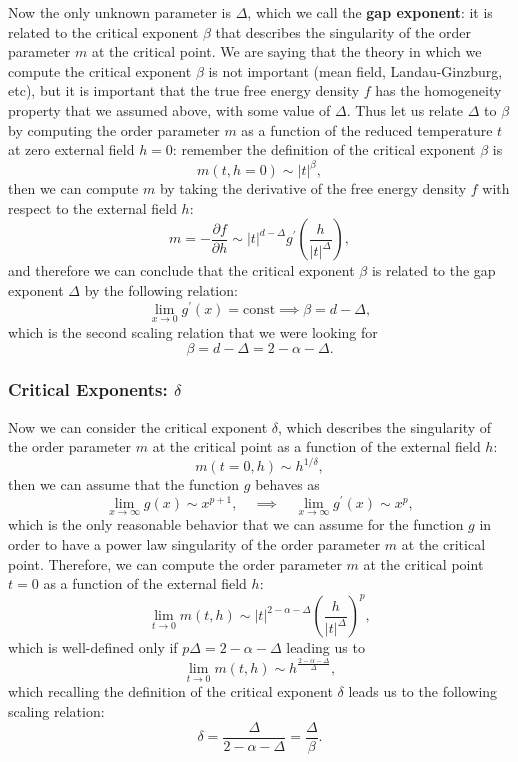Now the only unknown parameter is \(\Delta\), which we call the \textbf{gap exponent}: it is related to the critical exponent \(\beta\) that describes the singularity of the order parameter \(m\) at the critical point. We are saying that the theory in which we compute the critical exponent \(\beta\) is not important (mean field, Landau-Ginzburg, etc), but it is important that the true free energy density \(f\) has the homogeneity property that we assumed above, with some value of \(\Delta\). Thus let us relate \(\Delta\) to \(\beta\) by computing the order parameter \(m\) as a function of the reduced temperature \(t\) at zero external field \(h=0\): remember the definition of the critical exponent \(\beta\) is
\[
    m(t,h=0) \sim \vert t \vert^{\beta},
\]
then we can compute \(m\) by taking the derivative of the free energy density \(f\) with respect to the external field \(h\):
\[
    m = - \frac{\partial f}{\partial h} \sim \vert t \vert^{d-\Delta} g^{\prime} \left(\frac{h}{\vert t \vert^{\Delta}}\right),
\]
and therefore we can conclude that the critical exponent \(\beta\) is related to the gap exponent \(\Delta\) by the following relation:
\[
    \lim_{x \to 0} g^{\prime}(x) = \text{const} \implies \beta = d - \Delta,
\]
which is the second scaling relation that we were looking for
\[
    \beta = d - \Delta = 2 - \alpha - \Delta.
\]

\subsubsection{Critical Exponents: \(\delta\)}

Now we can consider the critical exponent \(\delta\), which describes the singularity of the order parameter \(m\) at the critical point as a function of the external field \(h\):
\[
    m(t=0,h) \sim h^{1/\delta},
\]
then we can assume that the function \(g\) behaves as
\[
    \lim_{x \to \infty} g(x) \sim x^{p+1}, \quad \implies \quad \lim_{x \to \infty} g^{\prime}(x) \sim x^p,
\]
which is the only reasonable behavior that we can assume for the function \(g\) in order to have a power law singularity of the order parameter \(m\) at the critical point. Therefore, we can compute the order parameter \(m\) at the critical point \(t=0\) as a function of the external field \(h\):
\[
    \lim_{t \to 0} m(t,h) \sim \vert t \vert^{2-\alpha-\Delta} \left(\frac{h}{\vert t \vert^{\Delta}}\right)^{p},
\]
which is well-defined only if \(p \Delta = 2 - \alpha - \Delta\) leading us to
\[
    \lim_{t \to 0} m(t,h) \sim h^{\frac{2-\alpha-\Delta}{\Delta}},
\]
which recalling the definition of the critical exponent \(\delta\) leads us to the following scaling relation:
\[
    \delta = \frac{\Delta}{2-\alpha-\Delta} = \frac{\Delta}{\beta}.
\]

